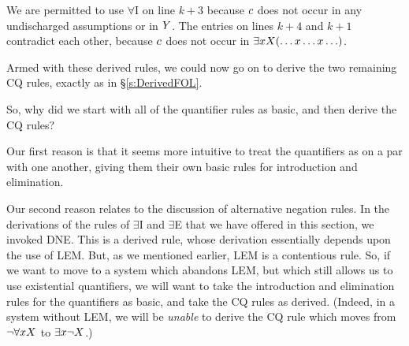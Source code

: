 \begin{pf}
	\open
	\close
	\open
	\close
\end{pf}\noindent
We are permitted to use $\forall$I on line $k+3$ because $c$ does not occur in any  undischarged assumptions or in $Y$. The entries on lines $k+4$ and $k+1$ contradict each other, because $c$ does not occur in $\exists x X(\ldots x \ldots x \ldots)$.

Armed with these derived rules, we could now go on to derive the two remaining CQ rules, exactly as in \S\ref{s:DerivedFOL}.

So, why did we start with all of the quantifier rules as basic, and then derive the CQ rules? 

Our first reason is that it seems more intuitive to treat the quantifiers as on a par with one another, giving them their own basic rules for introduction and elimination. 

Our second reason relates to the discussion of alternative negation rules. In the derivations of the rules of $\exists$I and $\exists$E that we have offered in this section, we invoked DNE. This is a derived rule, whose derivation essentially depends upon the use of LEM. But, as we mentioned earlier, LEM is a contentious rule. So, if we want to move to a system which abandons LEM, but which still allows us to use existential quantifiers, we will want to take the introduction and elimination rules for the quantifiers as basic, and take the CQ rules as derived. (Indeed, in a system without LEM, we will be \emph{unable} to derive the CQ rule which moves from $\neg \forall x X$ to $\exists x \neg X$.)

